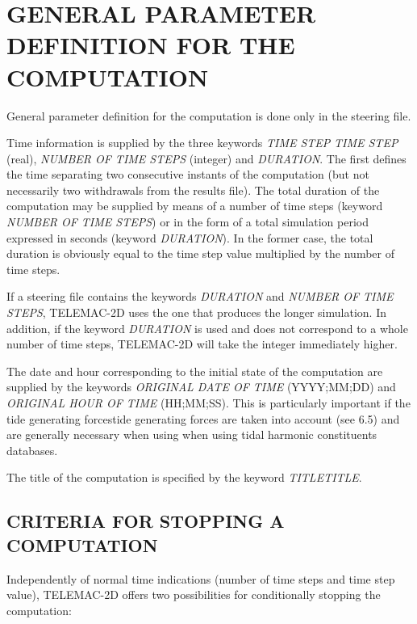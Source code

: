 

\chapter{  GENERAL PARAMETER DEFINITION FOR THE COMPUTATION}

 General parameter definition for the computation is done only in the steering file.

 Time information is supplied by the three keywords \textit{TIME STEP} \textit{TIME STEP} (real), \textit{NUMBER OF TIME STEPS }(integer) and \textit{DURATION}. The first defines the time separating two consecutive instants of the computation (but not necessarily two withdrawals from the results file). The total duration of the computation may be supplied by means of a number of time steps (keyword \textit{NUMBER OF TIME STEPS}) or in the form of a total simulation period expressed in seconds (keyword \textit{DURATION}). In the former case, the total duration is obviously equal to the time step value multiplied by the number of time steps.

 If a steering file contains the keywords \textit{DURATION} and \textit{NUMBER OF TIME STEPS}, TELEMAC-2D uses the one that produces the longer simulation. In addition, if the keyword \textit{DURATION} is used and does not correspond to a whole number of time steps, TELEMAC-2D will take the integer immediately higher.

 The date and hour corresponding to the initial state of the computation are supplied by the keywords \textit{ORIGINAL DATE OF TIME} (YYYY;MM;DD) and \textit{ORIGINAL HOUR OF TIME} (HH;MM;SS). This is particularly important if the tide generating forcestide generating forces are taken into account (see 6.5) and are generally necessary when using when using tidal harmonic constituents databases.

 The title of the computation is specified by the keyword \textit{TITLETITLE}.


\section{ CRITERIA FOR STOPPING A COMPUTATION}

 Independently of normal time indications (number of time steps and time step value), TELEMAC-2D offers two possibilities for conditionally stopping the computation:

